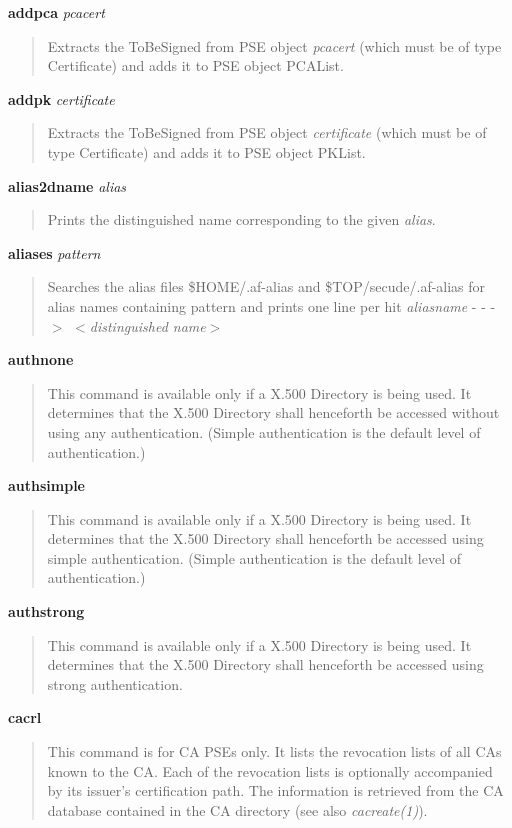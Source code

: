 {\bf addpca} {\em pcacert}
\begin{quote}
Extracts the ToBeSigned from PSE object {\em pcacert} (which must be of type Certificate)
and adds it to PSE object PCAList.
\end{quote}

{\bf addpk} {\em certificate}
\begin{quote}
Extracts the ToBeSigned from PSE object {\em certificate} (which must be of type Certificate)
and adds it to PSE object PKList.
\end{quote}

{\bf alias2dname} {\em alias}
\begin{quote}
Prints the distinguished name corresponding to the given {\em alias}.
\end{quote}

{\bf aliases} {\em pattern}
\begin{quote}
Searches the alias files \$HOME/.af-alias and \$TOP/secude/.af-alias for alias names
containing pattern and prints one line per hit
\bc
{\em aliasname} - - -$>$ $<${\em distinguished name}$>$
\ec
\end{quote}

{\bf authnone}
\begin{quote}
This command is available only if a X.500 Directory is being used.
It determines that the X.500 Directory shall henceforth be accessed without using any authentication.
(Simple authentication is the default level of authentication.) 
\end{quote}

{\bf authsimple}
\begin{quote}
This command is available only if a X.500 Directory is being used.
It determines that the X.500 Directory shall henceforth be accessed using simple authentication.
(Simple authentication is the default level of authentication.) 
\end{quote}

{\bf authstrong}
\begin{quote}
This command is available only if a X.500 Directory is being used.
It determines that the X.500 Directory shall henceforth be accessed using strong authentication. 
\end{quote}

{\bf cacrl}
\begin{quote}
This command is for CA PSEs only.
It lists the revocation lists of all CAs known to the CA. Each of the revocation lists is optionally
accompanied by its issuer's certification path. 
The information is retrieved from the CA database contained in the CA directory (see also {\em 
cacreate(1)}).
\end{quote}

